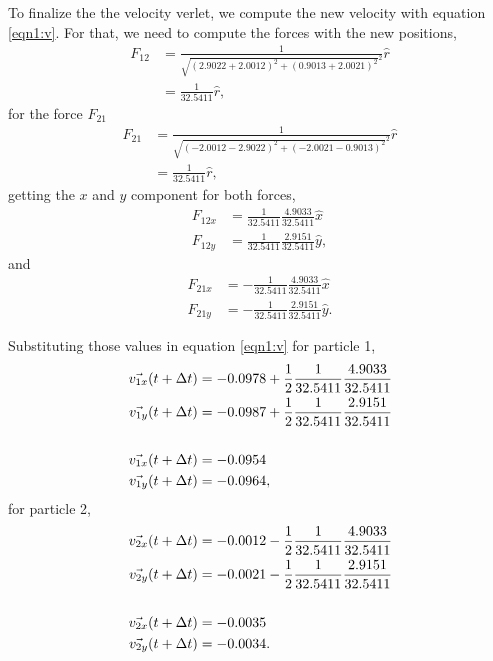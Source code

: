 \documentclass[main.tex]{subfiles}
\begin{document}
To finalize the the velocity verlet, we compute the new velocity with equation \eqref{eqn1:v}.
For that, we need to compute the forces with the new positions,
\begin{align*}
    F_{12} &= \frac{1}{\sqrt{ (2.9022+2.0012)^{2} + (0.9013+2.0021)^{2} }^{2}}\hat{r} \\
    &= \frac{1}{32.5411}\hat{r},
\end{align*}
for the force $F_{21}$
\begin{align*}
    F_{21} &= \frac{1}{\sqrt{ (-2.0012-2.9022)^{2} + (-2.0021-0.9013)^{2} }^{2}}\hat{r} \\
    &= \frac{1}{32.5411}\hat{r},
\end{align*}
getting the $x$ and $y$ component for both forces,
\begin{align*}
    F_{12x} &= \frac{1}{32.5411}\frac{4.9033}{32.5411}\hat{x} \\
    F_{12y} &= \frac{1}{32.5411}\frac{2.9151}{32.5411}\hat{y},
\end{align*}
and
\begin{align*}
    F_{21x} &= -\frac{1}{32.5411}\frac{4.9033}{32.5411}\hat{x} \\
    F_{21y} &= -\frac{1}{32.5411}\frac{2.9151}{32.5411}\hat{y}.
\end{align*}

Substituting those values in equation \eqref{eqn1:v} for particle 1,
\begin{align*}
    \vec{v_{1x}}\qty(t+\Delta t) &= -0.0978 + \frac{1}{2}\frac{1}{32.5411}\frac{4.9033}{32.5411} \\
    \vec{v_{1y}}\qty(t+\Delta t) &= -0.0987 + \frac{1}{2}\frac{1}{32.5411}\frac{2.9151}{32.5411} \\
    \\
    \vec{v_{1x}}\qty(t+\Delta t) &= -0.0954 \\
    \vec{v_{1y}}\qty(t+\Delta t) &= -0.0964,
\end{align*}
for particle 2,
\begin{align*}
    \vec{v_{2x}}\qty(t+\Delta t) &= -0.0012 - \frac{1}{2}\frac{1}{32.5411}\frac{4.9033}{32.5411} \\
    \vec{v_{2y}}\qty(t+\Delta t) &= -0.0021 - \frac{1}{2}\frac{1}{32.5411}\frac{2.9151}{32.5411} \\
    \\
    \vec{v_{2x}}\qty(t+\Delta t) &= -0.0035 \\
    \vec{v_{2y}}\qty(t+\Delta t) &= -0.0034.
\end{align*}
\end{document}
